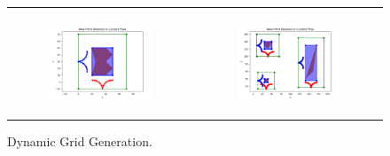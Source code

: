 \begin{figure}[H]
    \centering
    \begin{tabular}{cc} 
        \begin{subfigure}{0.5\textwidth}
            \centering
            \includegraphics[width=\textwidth]{Images/Algorithm_obs/Grid/new_ob1.png}
        \end{subfigure} 
        &
        \begin{subfigure}{0.5\textwidth}
            \centering
            \includegraphics[width=\textwidth]{Images/Algorithm_obs/Grid/multi_obs.png}
        \end{subfigure}
    \end{tabular}
    \caption{Dynamic Grid Generation.\label{fig:Dynamic_Grid_Generation}} 
\end{figure}


